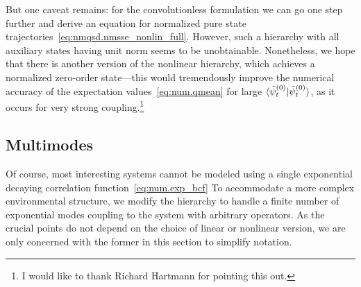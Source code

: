 But one caveat remains: for the convolutionless formulation we can go one step further and derive an equation for normalized pure state trajectories~\ref{eq:nmqsd.nmsse_nonlin_full}.
However, such a hierarchy with all auxiliary states having unit norm seems to be unobtainable.
Nonetheless, we hope that there is another version of the nonlinear hierarchy, which achieves a normalized zero-order state---this would tremendously improve the numerical accuracy of the expectation values~\ref{eq:num.qmean} for large $\langle \tilde\psi_t^{(0)} | \tilde\psi_t^{(0)} \rangle$, as it occurs for very strong coupling.\footnote{%
  I would like to thank Richard Hartmann for pointing this out.
}



\subsection{Multimodes}
\label{sub:num.sheom.nonlin}

Of course, most interesting systems cannot be modeled using a single exponential decaying correlation function~\ref{eq:num.exp_bcf}
To accommodate a more complex environmental structure, we modify the hierarchy to handle a finite number of exponential modes coupling to the system with arbitrary operators.
As the crucial points do not depend on the choice of linear or nonlinear version, we are only concerned with the former in this section to simplify notation.

